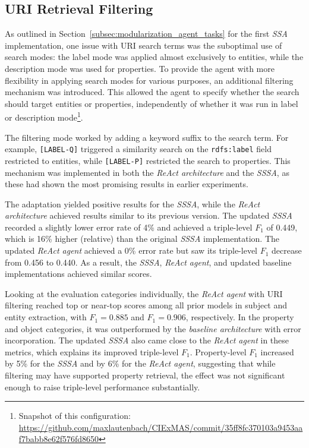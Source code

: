 \documentclass[a4paper,oneside,bibliography=totoc]{scrbook}
\begin{document}
\subsection{URI Retrieval Filtering}
\label{subsec:uri_retrieval_filtering}

As outlined in Section~\ref{subsec:modularization_agent_tasks} for the first \textit{\ac{SSA}} implementation, one issue with \ac{URI} search terms was the suboptimal use of search modes: the label mode was applied almost exclusively to entities, while the description mode was used for properties. To provide the agent with more flexibility in applying search modes for various purposes, an additional filtering mechanism was introduced. This allowed the agent to specify whether the search should target entities or properties, independently of whether it was run in label or description mode\footnote{Snapshot of this configuration: \url{https://github.com/maxlautenbach/CIExMAS/commit/35ff8fc370103a9453aaf7babb8e62f576fd8650}}.

The filtering mode worked by adding a keyword suffix to the search term. For example, \texttt{[LABEL-Q]} triggered a similarity search on the \texttt{rdfs:label} field restricted to entities, while \texttt{[LABEL-P]} restricted the search to properties. This mechanism was implemented in both the \textit{\ac{ReAct} architecture} and the \textit{\ac{SSSA}}, as these had shown the most promising results in earlier experiments.

The adaptation yielded positive results for the \textit{\ac{SSSA}}, while the \textit{\ac{ReAct} architecture} achieved results similar to its previous version. The updated \textit{\ac{SSSA}} recorded a slightly lower error rate of 4\% and achieved a triple-level $F_{1}$ of 0.449, which is 16\% higher (relative) than the original \textit{\ac{SSSA}} implementation. The updated \textit{\ac{ReAct} agent} achieved a 0\% error rate but saw its triple-level $F_{1}$ decrease from 0.456 to 0.440. As a result, the \textit{\ac{SSSA}}, \textit{\ac{ReAct} agent}, and updated baseline implementations achieved similar scores.

Looking at the evaluation categories individually, the \textit{\ac{ReAct} agent} with \ac{URI} filtering reached top or near-top scores among all prior models in subject and entity extraction, with $F_{1}=0.885$ and $F_{1}=0.906$, respectively. In the property and object categories, it was outperformed by the \textit{baseline architecture} with error incorporation. The updated \textit{\ac{SSSA}} also came close to the \textit{\ac{ReAct} agent} in these metrics, which explains its improved triple-level $F_{1}$. Property-level $F_{1}$ increased by 5\% for the \textit{\ac{SSSA}} and by 6\% for the \textit{\ac{ReAct} agent}, suggesting that while filtering may have supported property retrieval, the effect was not significant enough to raise triple-level performance substantially.
\end{document}
